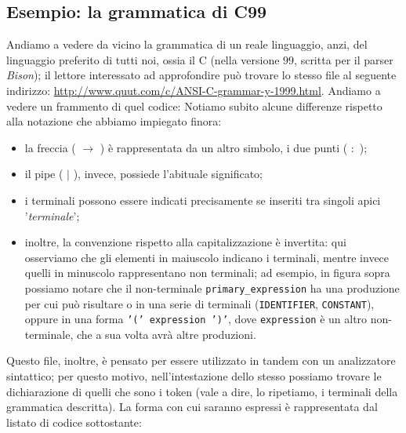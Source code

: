 \documentclass[class=book, crop=false, oneside, 12pt]{standalone}
\begin{document}
\subsection{Esempio: la grammatica di C99}
Andiamo a vedere da vicino la grammatica di un reale linguaggio, anzi, del linguaggio preferito di tutti noi, ossia il C (nella versione \(99\), scritta per il parser \emph{Bison}); il lettore interessato ad approfondire può trovare lo stesso file al seguente indirizzo: \url{http://www.quut.com/c/ANSI-C-grammar-y-1999.html}. Andiamo a vedere un frammento di quel codice:
Notiamo subito alcune differenze rispetto alla notazione che abbiamo impiegato finora: 
\begin{itemize}
    \item la freccia ( \(\to\) ) è rappresentata da un altro simbolo, i due punti ( \(:\) );
    \item il pipe ( \(\mid\) ), invece, possiede l'abituale significato;
    \item i terminali possono essere indicati precisamente se inseriti tra singoli apici '\emph{terminale}';
    \item inoltre, la convenzione rispetto alla capitalizzazione è invertita: qui osserviamo che gli elementi in maiuscolo indicano i terminali, mentre invece quelli in minuscolo rappresentano non terminali; ad esempio, in figura sopra possiamo notare che il non-terminale \texttt{primary\_expression} ha una produzione per cui può risultare o in una serie di terminali (\texttt{IDENTIFIER}, \texttt{CONSTANT}), oppure in una forma \texttt{'(' expression ')'}, dove \texttt{expression} è un altro non-terminale, che a sua volta avrà altre produzioni.
\end{itemize}

Questo file, inoltre, è pensato per essere utilizzato in tandem con un analizzatore sintattico; per questo motivo, nell'intestazione dello stesso possiamo trovare le dichiarazione di quelli che sono i token (vale a dire, lo ripetiamo, i terminali della grammatica descritta). La forma con cui saranno espressi è rappresentata dal listato di codice sottostante:
\end{document}

